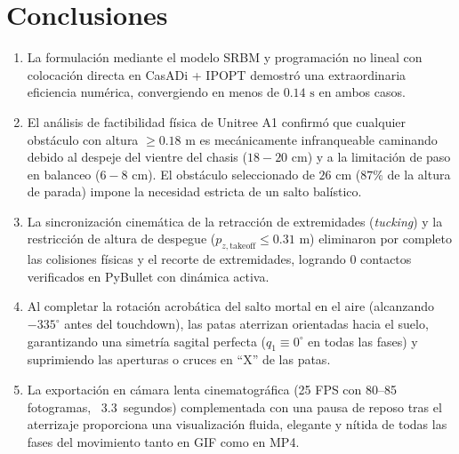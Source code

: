 \documentclass[11pt,a4paper]{article}
\begin{document}
\section{Conclusiones}
\begin{enumerate}
    \item La formulación mediante el modelo SRBM y programación no lineal con colocación directa en CasADi + IPOPT demostró una extraordinaria eficiencia numérica, convergiendo en menos de $0.14\text{ s}$ en ambos casos.
    \item El análisis de factibilidad física de Unitree A1 confirmó que cualquier obstáculo con altura $\ge 0.18\text{ m}$ es mecánicamente infranqueable caminando debido al despeje del vientre del chasis ($18-20\text{ cm}$) y a la limitación de paso en balanceo ($6-8\text{ cm}$). El obstáculo seleccionado de $26\text{ cm}$ ($87\%$ de la altura de parada) impone la necesidad estricta de un salto balístico.
    \item La sincronización cinemática de la retracción de extremidades (\textit{tucking}) y la restricción de altura de despegue ($p_{z,\text{takeoff}} \le 0.31\text{ m}$) eliminaron por completo las colisiones físicas y el recorte de extremidades, logrando $0$ contactos verificados en PyBullet con dinámica activa.
    \item Al completar la rotación acrobática del salto mortal en el aire (alcanzando $-335^\circ$ antes del touchdown), las patas aterrizan orientadas hacia el suelo, garantizando una simetría sagital perfecta ($q_1 \equiv 0^\circ$ en todas las fases) y suprimiendo las aperturas o cruces en ``X'' de las patas.
    \item La exportación en cámara lenta cinematográfica (25 FPS con 80--85 fotogramas, ~3.3~segundos) complementada con una pausa de reposo tras el aterrizaje proporciona una visualización fluida, elegante y nítida de todas las fases del movimiento tanto en GIF como en MP4.
\end{enumerate}
\end{document}
